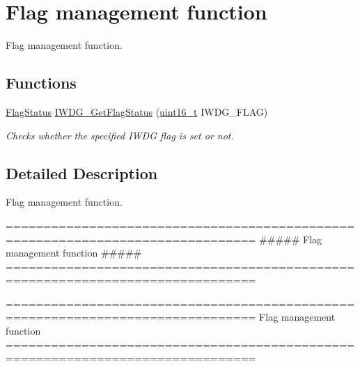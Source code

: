 \hypertarget{group___i_w_d_g___group3}{\section{Flag management function}
\label{group___i_w_d_g___group3}
}


Flag management function.  


\subsection*{Functions}
\begin{DoxyCompactItemize}
\item 
\hyperlink{group___exported__types_ga89136caac2e14c55151f527ac02daaff}{Flag\-Status} \hyperlink{group___i_w_d_g___group3_ga37f050cfbedc0c15f9e0816c0b22011e}{I\-W\-D\-G\-\_\-\-Get\-Flag\-Status} (\hyperlink{stdint_8h_a273cf69d639a59973b6019625df33e30}{uint16\-\_\-t} I\-W\-D\-G\-\_\-\-F\-L\-A\-G)
\begin{DoxyCompactList}\small\item\em Checks whether the specified I\-W\-D\-G flag is set or not. \end{DoxyCompactList}\end{DoxyCompactItemize}


\subsection{Detailed Description}
Flag management function. \begin{DoxyVerb} ===============================================================================
                     ##### Flag management function ##### 
 ===============================================================================  \end{DoxyVerb}


\begin{DoxyVerb} ===============================================================================
                            Flag management function 
 ===============================================================================  \end{DoxyVerb}
 

